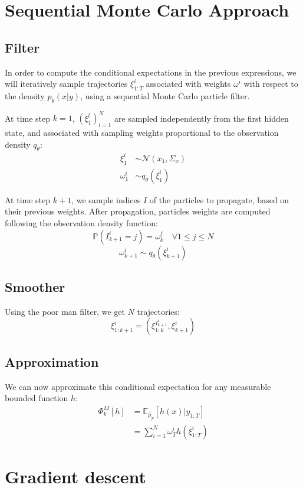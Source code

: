 \documentclass[10pt,a4paper]{report}
\begin{document}
\section{Sequential Monte Carlo Approach}
\label{sec:smc}

\subsection{Filter}
In order to compute the conditional expectations in the previous expressions, we will iteratively sample trajectories $\xi_{1:T}^i$ associated with weights $\omega^i$ with respect to the density $p_\theta(x | y)$, using a sequential Monte Carlo particle filter.

At time step $k=1$, $(\xi_1^l)_{l=1}^N$ are sampled independently from the first hidden state, and associated with sampling weights proportional to the observation density $q_\theta$:
\begin{align*}
        \xi_1^i    & \sim \mathcal{N}(x_1, \Sigma_x) \\
        \omega_1^i & \sim q_\theta(\xi_1^i)
\end{align*}

At time step $k+1$, we sample indices $I$ of the particles to propagate, based on their previous weights.
After propagation, particles weights are computed following the observation density function:
$$\mathbb{P}(I_{k+1}^i=j) = \omega_k^j \quad \forall 1 \leq j \leq N$$
$$\omega_{k+1}^i \sim q_\theta(\xi_{k+1}^i)$$

\subsection{Smoother}
Using the poor man filter, we get $N$ trajectories:
$$\xi_{1:k+1}^{i} = (\xi_{1:k}^{I_{k+1}^i}, \xi_{k+1}^i)$$

\subsection{Approximation}
We can now approximate this conditional expectation for any measurable bounded function $h$:
\begin{align*}
        \Phi_k^M[h] & = \mathbb{E}_{\hat \mu_p} \left[ h(x) | y_{1:T} \right] \\
                    & = \sum_{i=1}^N \omega_T^i h(\xi_{1:T}^i)
\end{align*}

\section{Gradient descent}
\label{sec:gradient_descent}
\end{document}
